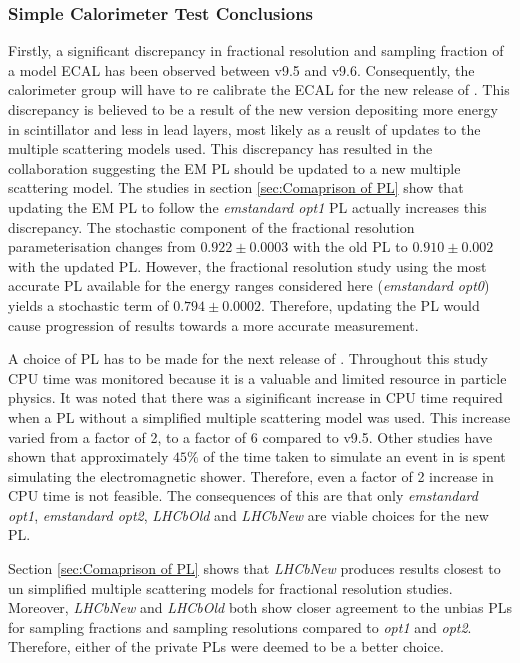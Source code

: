 \subsubsection{Simple Calorimeter Test Conclusions}
\label{ref:CaloConclusions}
Firstly, a significant discrepancy in fractional resolution and sampling fraction of a model \lhcb ECAL has been observed between \geant v9.5 and v9.6.  Consequently, the \lhcb calorimeter group will have to re calibrate the ECAL for the new release of \gauss. This discrepancy is believed to be a result of the new \geant version depositing more energy in scintillator and less in lead layers, most likely as a reuslt of updates to the multiple scattering models used.  This discrepancy has resulted in the \geant collaboration suggesting the \lhcb EM PL should be updated to a new multiple scattering model.  The studies in section \ref{sec:Comaprison of PL} show that updating the \lhcb EM PL to follow the \textit{emstandard opt1} PL actually increases this discrepancy. The stochastic component of the fractional resolution parameterisation changes from $0.922 \pm 0.0003$ with the old \lhcb PL to $0.910\pm 0.002$ with the updated \lhcb PL. However, the fractional resolution study using the most accurate PL available for the energy ranges considered here (\textit{emstandard opt0}) yields a stochastic term of $0.794\pm0.0002$.  Therefore, updating the \lhcb PL would cause progression of results towards a more accurate measurement.

A choice of PL has to be made for the next release of \gauss.  Throughout this study CPU time was monitored because it is a valuable and limited resource in particle physics.  It was noted that there was a siginificant increase in CPU time required when a PL without a simplified multiple scattering model was used. This increase varied from a factor of 2, to a factor of 6 compared to v9.5.  Other studies have shown that approximately $45\%$ of the time taken to simulate an event in \gauss is spent simulating the electromagnetic shower.  Therefore, even a factor of 2 increase in CPU time is not feasible.  The consequences of this are that only \textit{emstandard opt1}, \textit{emstandard opt2}, \textit{LHCbOld} and \textit{LHCbNew} are viable choices for the new PL.

Section \ref{sec:Comaprison of PL} shows that \textit{LHCbNew} produces results closest to un simplified multiple scattering models for fractional resolution studies.  Moreover, \textit{LHCbNew} and \textit{LHCbOld} both show closer agreement to the unbias PLs for sampling fractions and sampling resolutions compared to \textit{opt1} and \textit{opt2}.  Therefore, either of the \lhcb private PLs were deemed to be a better choice. 

